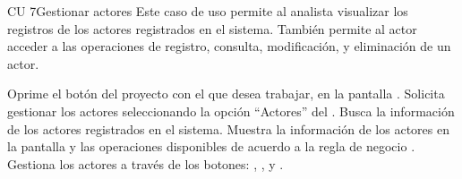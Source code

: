 \newpage 
\begin{UseCase}{CU 7}{Gestionar actores}
	{
		Este caso de uso permite al analista visualizar los registros de los actores registrados en el sistema. También permite 
		al actor acceder a las operaciones de registro, consulta, modificación, 
		y eliminación de un actor.
	}
	
	

	


\end{UseCase}
 \begin{UCtrayectoria}
	\UCpaso[\UCactor] Oprime el botón \btnEntrar del proyecto con el que desea trabajar, en la pantalla .
    \UCpaso[\UCactor] Solicita gestionar los actores seleccionando la opción ``Actores'' del .
    \UCpaso[\UCsist] Busca la información de los actores registrados en el sistema. 
    \UCpaso[\UCsist] Muestra la información de los actores en la pantalla  y las operaciones 
    disponibles de acuerdo a la regla de negocio . 
    \UCpaso[\UCactor] Gestiona los actores a través de los botones: , \btnConsulta, \btnEditar y \btnEliminar. \label{cu7:gestiona}
 \end{UCtrayectoria}
 
